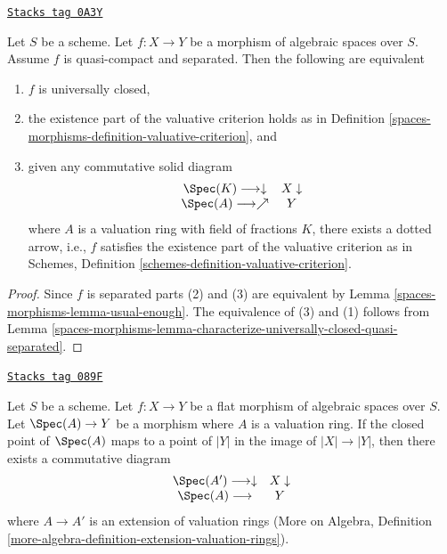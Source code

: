 \begin{lemma}
\label{spaces-morphisms-lemma-characterize-universally-closed-separated}
\href{https://stacks.math.columbia.edu/tag/0A3Y}{\texttt{Stacks tag 0A3Y}}

Let $S$ be a scheme. Let $f : X \to Y$ be a morphism of algebraic spaces
over $S$. Assume $f$ is quasi-compact and separated. Then the following
are equivalent
\begin{enumerate}
\item $f$ is universally closed,
\item the existence part of the valuative criterion holds
as in Definition \ref{spaces-morphisms-definition-valuative-criterion}, and
\item given any commutative solid diagram
$$
\begin{array}{cc}\Spec(K) \longrightarrow\downarrow & X \downarrow \\ \Spec(A) \longrightarrow\nearrow & Y\end{array}
$$
where $A$ is a valuation ring with field of fractions $K$, there exists
a dotted arrow, i.e., $f$ satisfies the existence part of the valuative
criterion as in
Schemes, Definition \ref{schemes-definition-valuative-criterion}.
\end{enumerate}
\end{lemma}

\begin{proof}
Since $f$ is separated parts (2) and (3) are equivalent by
Lemma \ref{spaces-morphisms-lemma-usual-enough}.
The equivalence of (3) and (1) follows from
Lemma \ref{spaces-morphisms-lemma-characterize-universally-closed-quasi-separated}.
\end{proof}

\begin{lemma}
\label{spaces-morphisms-lemma-lift-valuation-ring-through-flat-morphism}
\href{https://stacks.math.columbia.edu/tag/089F}{\texttt{Stacks tag 089F}}

Let $S$ be a scheme. Let $f : X \to Y$ be a flat morphism
of algebraic spaces over $S$.
Let $\Spec(A) \to Y$ be a morphism where $A$ is a
valuation ring. If the closed point of $\Spec(A)$ maps to a
point of $|Y|$ in the image of $|X| \to |Y|$, then there exists
a commutative diagram
$$
\begin{array}{cc}\Spec(A') \longrightarrow\downarrow & X \downarrow \\ \Spec(A) \longrightarrow & Y\end{array}
$$
where $A \to A'$ is an extension of valuation rings
(More on Algebra, Definition
\ref{more-algebra-definition-extension-valuation-rings}).
\end{lemma}


